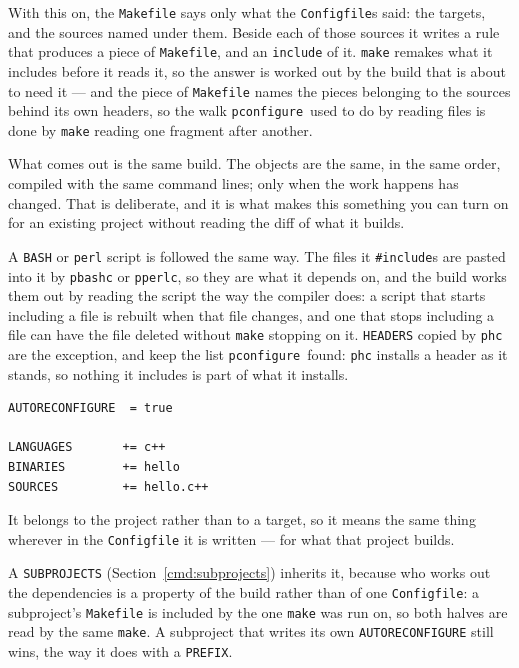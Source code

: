 \documentclass{article}
\newcommand{\pconfigure}{\texttt{pconfigure}}
\begin{document}
With this on, the \texttt{Makefile} says only what the
\texttt{Configfile}s said: the targets, and the sources named under
them.  Beside each of those sources it writes a rule that produces a
piece of \texttt{Makefile}, and an \texttt{include} of it.
\texttt{make} remakes what it includes before it reads it, so the
answer is worked out by the build that is about to need it --- and the
piece of \texttt{Makefile} names the pieces belonging to the sources
behind its own headers, so the walk \pconfigure\ used to do by reading
files is done by \texttt{make} reading one fragment after another.

What comes out is the same build.  The objects are the same, in the
same order, compiled with the same command lines; only when the work
happens has changed.  That is deliberate, and it is what makes this
something you can turn on for an existing project without reading the
diff of what it builds.

A \texttt{BASH} or \texttt{perl} script is followed the same way.  The
files it \texttt{\#include}s are pasted into it by \texttt{pbashc} or
\texttt{pperlc}, so they are what it depends on, and the build works
them out by reading the script the way the compiler does: a script
that starts including a file is rebuilt when that file changes, and
one that stops including a file can have the file deleted without
\texttt{make} stopping on it.  \texttt{HEADERS} copied by
\texttt{phc} are the exception, and keep the list \pconfigure\ found:
\texttt{phc} installs a header as it stands, so nothing it includes
is part of what it installs.

\begin{verbatim}
AUTORECONFIGURE  = true

LANGUAGES       += c++
BINARIES        += hello
SOURCES         += hello.c++
\end{verbatim}

It belongs to the project rather than to a target, so it means the
same thing wherever in the \texttt{Configfile} it is written --- for
what that project builds.

A \texttt{SUBPROJECTS} (Section~\ref{cmd:subprojects}) inherits it,
because who works out the dependencies is a property of the build
rather than of one \texttt{Configfile}: a subproject's
\texttt{Makefile} is included by the one \texttt{make} was run on, so
both halves are read by the same \texttt{make}.  A subproject that
writes its own \texttt{AUTORECONFIGURE} still wins, the way it does
with a \texttt{PREFIX}.
\end{document}
